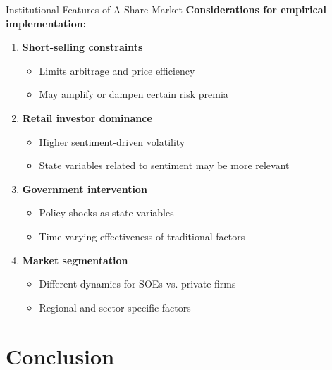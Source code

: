 \documentclass{beamer}
\begin{document}
\begin{frame}{Institutional Features of A-Share Market}
\textbf{Considerations for empirical implementation:}

\begin{enumerate}
\item \textbf{Short-selling constraints}
\begin{itemize}
\item Limits arbitrage and price efficiency
\item May amplify or dampen certain risk premia
\end{itemize}
\vspace{0.2cm}

\item \textbf{Retail investor dominance}
\begin{itemize}
\item Higher sentiment-driven volatility
\item State variables related to sentiment may be more relevant
\end{itemize}
\vspace{0.2cm}

\item \textbf{Government intervention}
\begin{itemize}
\item Policy shocks as state variables
\item Time-varying effectiveness of traditional factors
\end{itemize}
\vspace{0.2cm}

\item \textbf{Market segmentation}
\begin{itemize}
\item Different dynamics for SOEs vs. private firms
\item Regional and sector-specific factors
\end{itemize}
\end{enumerate}
\end{frame}

\section{Conclusion}
\end{document}

